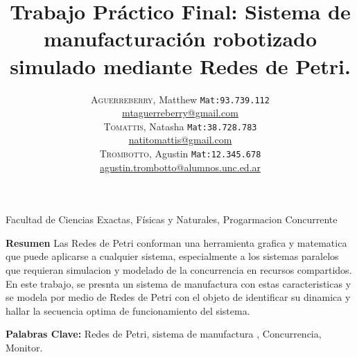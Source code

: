 \documentclass[10pt, a4paper,notitlepage]{article}
\newcommand{\HRule}{\rule{\linewidth}{0.5mm}} %
\begin{document}
{\center \large \textsf{Facultad de Ciencias Exactas, Físicas y Naturales, Progarmacion Concurrente\\}}
\title{%
		{ \bfseries{Trabajo Práctico Final: Sistema de manufacturación robotizado simulado mediante Redes de Petri.}}\\[0.4cm]
		} %
\author{
	\textsc{Aguerreberry}, Matthew  {\small \texttt{Mat:93.739.112}}\\
	\href{mailto:mtaguerreberry@gmail.com}{mtaguerreberry@gmail.com}\\
	\textsc{Tomattis}, Natasha  {\small \texttt{Mat:38.728.783}}\\
	\href{mailto:natitomattis@gmail.com}{natitomattis@gmail.com}\\
	\textsc{Trombotto}, Agustin  {\small \texttt{Mat:12.345.678}}\\
	\href{mailto:agustin.trombotto@alumnos.unc.ed.ar}{agustin.trombotto@alumnos.unc.ed.ar}\\
}

{\let\newpage\relax\maketitle}

\begin{par}  
\textbf{Resumen} Las Redes de Petri conforman una herramienta grafica y matematica que puede aplicarse a cualquier sistema, especialmente a los sistemas paralelos que requieran simulacion y modelado de la concurrencia en recursos compartidos. En este trabajo, se presnta un sistema de manufactura con estas caracteristicas y se modela por medio de Redes de Petri con el objeto de identificar su dinamica y hallar la secuencia optima de funcionamiento del sistema.
\\  
\end{par}

\textbf{Palabras Clave:} Redes de Petri, sistema de manufactura , Concurrencia, Monitor.\\
\end{document}
